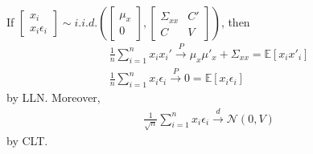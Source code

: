 \documentclass[11pt]{elegantbook}
\begin{document}
\begin{remark}
    If $\begin{bmatrix}
        x_i\\
        x_i\epsilon_i
    \end{bmatrix}\sim i.i.d. \left(\begin{bmatrix}
        \mu_x\\
        0
    \end{bmatrix},\begin{bmatrix}
        \Sigma_{xx}&	C'\\
        C & V
    \end{bmatrix}\right)$, then
    \begin{equation}
        \begin{aligned}
            \frac{1}{n}\sum_{i=1}^n x_ix_i' \stackrel{P}{\longrightarrow} \mu_x\mu'_x+\Sigma_{xx}=\mathbb{E}[x_ix'_i]\\
            \frac{1}{n}\sum_{i=1}^n x_i\epsilon_i \stackrel{P}{\longrightarrow} 0=\mathbb{E}[x_i\epsilon_i]
        \end{aligned}
        \nonumber
    \end{equation}
    by LLN. Moreover,
    \begin{equation}
        \begin{aligned}
            \frac{1}{\sqrt{n}}\sum_{i=1}^n x_i\epsilon_i \stackrel{d}{\longrightarrow} \mathcal{N}(0,V)
        \end{aligned}
        \nonumber
    \end{equation}
    by CLT.
\end{remark}
\end{document}
